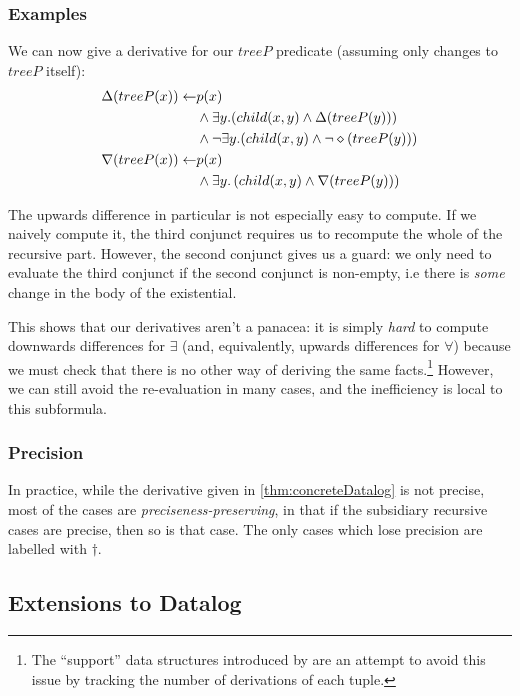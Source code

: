 \subsubsection{Examples}

We can now give a derivative for our $treeP$ predicate (assuming only changes to
$treeP$ itself):
\begin{align*}
  \Delta(treeP(x)) \leftarrow & p(x)\\
    &\wedge
    \exists y. (
      child(x, y)
      \wedge
      \Delta(treeP(y))
    )\\
    &\wedge 
    \neg \exists y. (
      child(x, y)
      \wedge
      \neg \diamond(treeP(y))
    )\\
  \nabla(treeP(x)) \leftarrow & p(x)\\
  &\wedge \exists y. \left( child(x, y) \wedge \nabla(treeP(y)) \right)
\end{align*}

The upwards difference in particular is not especially easy to compute. If we naively compute it, the
third conjunct requires us to recompute the whole of the recursive part. However,
the second conjunct gives us a
guard: we only need to evaluate the third conjunct if the second conjunct is
non-empty, i.e there is \emph{some} change in the body of the existential.

This shows that our derivatives aren't a panacea: it is simply \emph{hard} to compute
downwards differences for $\exists$ (and, equivalently, upwards differences for
$\forall$) because we must check that there is no other way of deriving the same
facts.\footnote{The ``support'' data structures introduced by
  \autocite{gupta1993maintaining} are an attempt to avoid this issue by
  tracking the number of derivations of each tuple.} However, we can still avoid
the re-evaluation in many cases, and the inefficiency is local to this subformula.

\subsubsection{Precision}

In practice, while the derivative given in \cref{thm:concreteDatalog} is not
precise, most of the cases are \emph{preciseness-preserving}, in that if the
subsidiary recursive cases are precise, then so is that case. The only cases
which lose precision are labelled with $\dagger$.

\subsection{Extensions to Datalog}
\label{sec:extensions}

